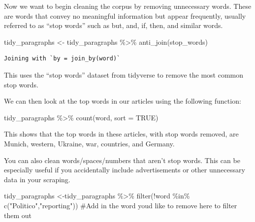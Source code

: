 \documentclass[
  letterpaper,
  DIV=11,
  numbers=noendperiod]{scrartcl}
\newenvironment{Shaded}{\begin{snugshade}}{\end{snugshade}}
\newcommand{\AttributeTok}[1]{\textcolor[rgb]{0.40,0.45,0.13}{#1}}
\newcommand{\CommentTok}[1]{\textcolor[rgb]{0.37,0.37,0.37}{#1}}
\newcommand{\ConstantTok}[1]{\textcolor[rgb]{0.56,0.35,0.01}{#1}}
\newcommand{\FunctionTok}[1]{\textcolor[rgb]{0.28,0.35,0.67}{#1}}
\newcommand{\NormalTok}[1]{\textcolor[rgb]{0.00,0.23,0.31}{#1}}
\newcommand{\OtherTok}[1]{\textcolor[rgb]{0.00,0.23,0.31}{#1}}
\newcommand{\SpecialCharTok}[1]{\textcolor[rgb]{0.37,0.37,0.37}{#1}}
\newcommand{\StringTok}[1]{\textcolor[rgb]{0.13,0.47,0.30}{#1}}
\begin{document}
Now we want to begin cleaning the corpus by removing unnecessary words.
These are words that convey no meaningful information but appear
frequently, usually referred to as ``stop words'' such as but, and, if,
then, and similar words.

\begin{Shaded}
\begin{Highlighting}[]
\NormalTok{tidy\_paragraphs }\OtherTok{\textless{}{-}}\NormalTok{ tidy\_paragraphs }\SpecialCharTok{\%\textgreater{}\%}
  \FunctionTok{anti\_join}\NormalTok{(stop\_words)}
\end{Highlighting}
\end{Shaded}

\begin{verbatim}
Joining with `by = join_by(word)`
\end{verbatim}

This uses the ``stop words'' dataset from tidyverse to remove the most
common stop words.

We can then look at the top words in our articles using the following
function:

\begin{Shaded}
\begin{Highlighting}[]
\NormalTok{tidy\_paragraphs }\SpecialCharTok{\%\textgreater{}\%}
  \FunctionTok{count}\NormalTok{(word, }\AttributeTok{sort =} \ConstantTok{TRUE}\NormalTok{) }
\end{Highlighting}
\end{Shaded}

This shows that the top words in these articles, with stop words
removed, are Munich, western, Ukraine, war, countries, and Germany.

You can also clean words/spaces/numbers that aren't stop words. This can
be especially useful if you accidentally include advertisements or other
unnecessary data in your scraping.

\begin{Shaded}
\begin{Highlighting}[]
\NormalTok{tidy\_paragraphs }\OtherTok{\textless{}{-}}\NormalTok{tidy\_paragraphs }\SpecialCharTok{\%\textgreater{}\%}
  \FunctionTok{filter}\NormalTok{(}\SpecialCharTok{!}\NormalTok{word }\SpecialCharTok{\%in\%} \FunctionTok{c}\NormalTok{(}\StringTok{"Politico"}\NormalTok{,}\StringTok{"reporting"}\NormalTok{)) }\CommentTok{\#Add in the word you\textquotesingle{}d like to remove here to filter them out}
\end{Highlighting}
\end{Shaded}
\end{document}
